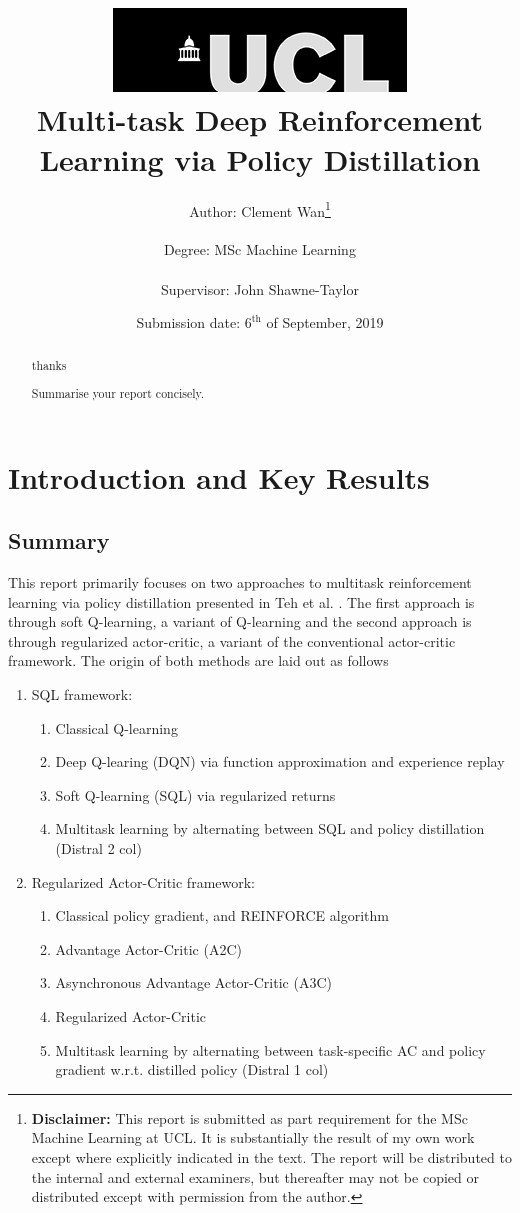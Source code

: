 \documentclass[12pt]{report}
\title{  	{ \includegraphics[scale=.5]{figs/ucl_logo.png}}\\
{{\Huge Multi-task Deep Reinforcement Learning via Policy Distillation}}\\
		}
\date{Submission date: $6^{\text{th}}$ of September, 2019}
\author{Author: Clement Wan\thanks{
{\bf Disclaimer:}
This report is submitted as part requirement for the MSc Machine Learning at UCL. It is
substantially the result of my own work except where explicitly indicated in the text. The report will be distributed to the internal and external examiners, but thereafter may not be copied or distributed except with permission from the author.
}
\\ \\
Degree: MSc Machine Learning\\ \\
Supervisor: John Shawne-Taylor}
\begin{document}
 
\onehalfspacing
\maketitle
\renewcommand{\abstractname}{Acknowledgements}
\begin{abstract}
 thanks
\end{abstract}
\renewcommand{\abstractname}{Abstract}
\begin{abstract}
Summarise your report concisely.
\end{abstract}
\tableofcontents
\setcounter{page}{1}


\chapter{Introduction and Key Results}
\section{Summary}

This report primarily focuses on two approaches to multitask reinforcement learning via policy distillation presented in Teh et al. \cite{teh2017distral}. The first approach is through soft Q-learning, a variant of Q-learning and the second approach is through regularized actor-critic, a variant of the conventional actor-critic framework. The origin of both methods are laid out as follows

\begin{enumerate}
\item SQL framework:
\begin{enumerate}
    \item 
    Classical Q-learning
    \item
    Deep Q-learing (DQN) via function approximation and experience replay
    \item
    Soft Q-learning (SQL) via regularized returns
    \item
    Multitask learning by alternating between SQL and policy distillation (Distral 2 col)
\end{enumerate}    
\item Regularized Actor-Critic framework:
\begin{enumerate}
    \item 
    Classical policy gradient, and REINFORCE algorithm
    \item
    Advantage Actor-Critic (A2C)
    \item
    Asynchronous Advantage Actor-Critic (A3C)
    \item
    Regularized Actor-Critic
    \item
    Multitask learning by alternating between task-specific AC and policy gradient w.r.t. distilled policy (Distral 1 col)
\end{enumerate}
\end{enumerate}
\end{document}
